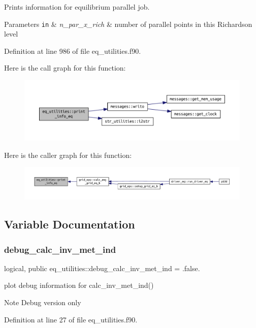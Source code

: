 Prints information for equilibrium parallel job. 


\begin{DoxyParams}[1]{Parameters}
\mbox{\tt in}  & {\em n\+\_\+par\+\_\+x\+\_\+rich} & number of parallel points in this Richardson level \\
\hline
\end{DoxyParams}


Definition at line 986 of file eq\+\_\+utilities.\+f90.

Here is the call graph for this function\+:
\nopagebreak
\begin{figure}[H]
\begin{center}
\leavevmode
\includegraphics[width=350pt]{namespaceeq__utilities_a40f397d20b45432117744ca16870ddbb_cgraph}
\end{center}
\end{figure}
Here is the caller graph for this function\+:
\nopagebreak
\begin{figure}[H]
\begin{center}
\leavevmode
\includegraphics[width=350pt]{namespaceeq__utilities_a40f397d20b45432117744ca16870ddbb_icgraph}
\end{center}
\end{figure}


\subsection{Variable Documentation}
\mbox{\label{namespaceeq__utilities_aedf0e1858d0bd16218a290f4857d416a}} 
\subsubsection{\texorpdfstring{debug\+\_\+calc\+\_\+inv\+\_\+met\+\_\+ind}{debug\_calc\_inv\_met\_ind}}
{\footnotesize\ttfamily logical, public eq\+\_\+utilities\+::debug\+\_\+calc\+\_\+inv\+\_\+met\+\_\+ind = .false.}



plot debug information for calc\+\_\+inv\+\_\+met\+\_\+ind() 

\begin{DoxyNote}{Note}
Debug version only 
\end{DoxyNote}


Definition at line 27 of file eq\+\_\+utilities.\+f90.

